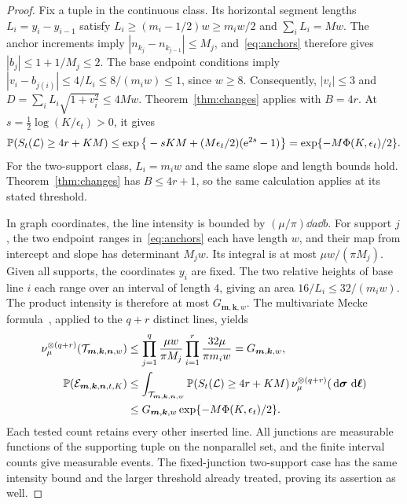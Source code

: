 \documentclass[11pt,letterpaper]{article}
\begin{document}
\begin{proof}
Fix a tuple in the continuous class. Its horizontal segment lengths $L_i=y_i-y_{i-1}$ satisfy $L_i\ge(m_i-1/2)w\ge m_iw/2$ and $\sum_iL_i=Mw$. The anchor increments imply $|n_{k_j}-n_{k_{j-1}}|\le M_j$, and~\eqref{eq:anchors} therefore gives $|b_j|\le1+1/M_j\le2$. The base endpoint conditions imply $|v_i-b_{j(i)}|\le4/L_i\le8/(m_iw)\le1$, since $w\ge8$. Consequently, $|v_i|\le3$ and $D=\sum_iL_i\sqrt{1+v_i^2}\le4Mw$. Theorem~\ref{thm:changes} applies with $B=4r$. At $s=\frac12\log(K/\epsilon_t)>0$, it gives
\begin{equation}\label{eq:tail}
 \mathbb P(S_t(\mathcal L)\ge4r+KM)
 \le\exp\big\{-sKM+(M\epsilon_t/2)(\mathrm{e}^{2s}-1)\big\}
 =\exp\{-M\Phi(K,\epsilon_t)/2\}.
\end{equation}
For the two-support class, $L_i=m_iw$ and the same slope and length bounds hold. Theorem~\ref{thm:changes} has $B\le4r+1$, so the same calculation applies at its stated threshold.

In graph coordinates, the line intensity is bounded by $(\mu/\pi)\dd a\dd b$. For support $j$, the two endpoint ranges in~\eqref{eq:anchors} each have length $w$, and their map from intercept and slope has determinant $M_jw$. Its integral is at most $\mu w/(\pi M_j)$. Given all supports, the coordinates $y_i$ are fixed. The two relative heights of base line $i$ each range over an interval of length $4$, giving an area $16/L_i\le32/(m_iw)$. The product intensity is therefore at most $G_{\boldsymbol m,\boldsymbol k,w}$. The multivariate Mecke formula~\cite[Theorem~4.4]{LP17}, applied to the $q+r$ distinct lines, yields
\begin{equation}\label{eq:mecke}
\begin{aligned}
 \nu_\mu^{\otimes(q+r)}(\mathcal T_{\boldsymbol m,\boldsymbol k,\boldsymbol n,w})
 &\le\prod_{j=1}^q\frac{\mu w}{\pi M_j}
                   \prod_{i=1}^r\frac{32\mu}{\pi m_iw}
   =G_{\boldsymbol m,\boldsymbol k,w},\\
 \mathbb P(\mathcal E_{\boldsymbol m,\boldsymbol k,\boldsymbol n,t,K})
 &\le\int_{\mathcal T_{\boldsymbol m,\boldsymbol k,\boldsymbol n,w}}
       \mathbb P(S_t(\mathcal L)\ge4r+KM)\,
                         \nu_\mu^{\otimes(q+r)}(\,\mathrm{d}\boldsymbol\sigma\,\,\mathrm{d}\boldsymbol\ell)\\
 &\le G_{\boldsymbol m,\boldsymbol k,w}\exp\{-M\Phi(K,\epsilon_t)/2\}.
\end{aligned}
\end{equation}
Each tested count retains every other inserted line. All junctions are measurable functions of the supporting tuple on the nonparallel set, and the finite interval counts give measurable events. The fixed-junction two-support case has the same intensity bound and the larger threshold already treated, proving its assertion as well.


\end{proof}
\end{document}
